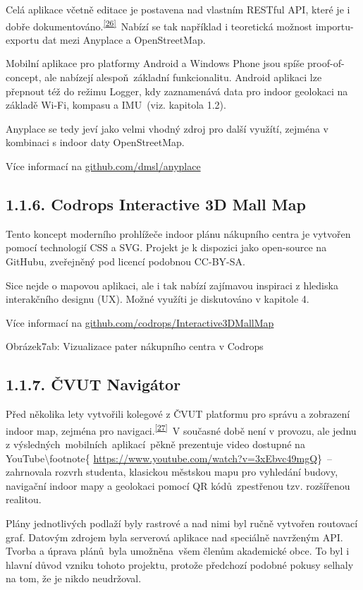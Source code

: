 Celá aplikace včetně editace je postavena nad vlastním RESTful API, které je i dobře dokumentováno.\textsuperscript{\href{}{{[}26{]}}}~Nabízí se tak například i teoretická možnost importu-exportu dat mezi Anyplace a OpenStreetMap.

Mobilní aplikace pro platformy Android a Windows Phone jsou spíše proof-of-concept, ale nabízejí alespoň~základní funkcionalitu. Android aplikaci lze přepnout též do režimu Logger, kdy zaznamenává data pro indoor geolokaci na základě Wi-Fi, kompasu a IMU~(viz. kapitola 1.2).

Anyplace se tedy jeví jako velmi vhodný zdroj pro další využítí, zejména v kombinaci s indoor daty OpenStreetMap.

Více informací na \href{}{github.com/dmsl/anyplace}~

\subsection{1.1.6. Codrops Interactive 3D Mall Map}\label{codrops-interactive-3d-mall-map}

Tento koncept moderního prohlížeče indoor plánu nákupního centra je vytvořen pomocí technologií CSS a SVG. Projekt je k dispozici jako open-source na GitHubu, zveřejněný pod licencí podobnou CC-BY-SA.

Sice nejde o mapovou aplikaci, ale i tak nabízí zajímavou inspiraci z hlediska interakčního designu (UX). Možné využíti je diskutováno v kapitole 4.

Více informací na \href{}{github.com/codrops/Interactive3DMallMap}

Obrázek7ab: Vizualizace pater nákupního centra v Codrops

\subsection{1.1.7. ČVUT Navigátor}\label{ux10dvut-naviguxe1tor}

Před několika lety vytvořili kolegové z ČVUT platformu pro správu a zobrazení indoor map, zejména pro navigaci.\textsuperscript{\href{}{{[}27{]}}}~V současné době není v provozu, ale jednu z výsledných~mobilních~aplikací~pěkně prezentuje video dostupné na YouTube\textbackslash{}footnote\{ \href{}{https://www.youtube.com/watch?v=3xEbvc49mgQ}\}~-- zahrnovala rozvrh studenta, klasickou městskou mapu pro vyhledání budovy, navigační indoor mapy a geolokaci pomocí QR kódů~zpestřenou tzv. rozšířenou realitou.

Plány jednotlivých podlaží byly rastrové a nad nimi byl ručně vytvořen routovací graf. Datovým zdrojem byla serverová aplikace nad speciálně navrženým API. Tvorba a úprava plánů~byla umožněna~všem členům akademické obce. To byl i hlavní důvod vzniku tohoto projektu, protože předchozí podobné pokusy selhaly na tom, že je nikdo neudržoval.


